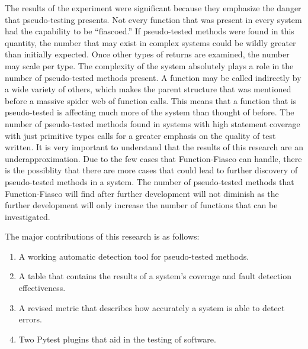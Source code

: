 The results of the experiment were significant because they emphasize the danger that pseudo-testing presents. Not every function that was present in every system had the capability to be ``fiascoed.'' If pseudo-tested methods were found in this quantity, the number that may exist in complex systems could be wildly greater than initially expected. Once other types of returns are examined, the number may scale per type. The complexity of the system absolutely plays a role in the number of pseudo-tested methods present. A function may be called indirectly by a wide variety of others, which makes the parent structure that was mentioned before a massive spider web of function calls. This means that a function that is pseudo-tested is affecting much more of the system than thought of before. The number of pseudo-tested methods found in systems with high statement coverage with just primitive types calls for a greater emphasis on the quality of test written. It is very important to understand that the results of this research are an underapproximation. Due to the few cases that Function-Fiasco can handle, there is the possiblity that there are more cases that could lead to further discovery of pseudo-tested methods in a system. The number of pseudo-tested methods that Function-Fiasco will find after further development will not diminish as the further development will only increase the number of functions that can be investigated.

The major contributions of this research is as follows:

\begin{enumerate}
  \item A working automatic detection tool for pseudo-tested methods.
  \item A table that contains the results of a system's coverage and fault detection effectiveness.
  \item A revised metric that describes how accurately a system is able to detect errors.
  \item Two Pytest plugins that aid in the testing of software.
\end{enumerate}


